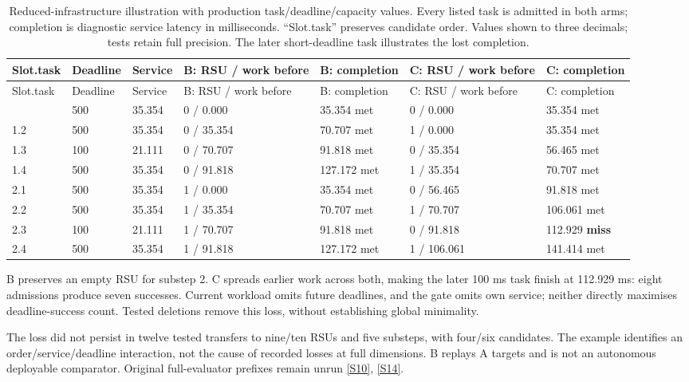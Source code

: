 \documentclass[12pt,a4paper]{article}
\begin{document}
\begingroup
\singlespacing\footnotesize\setlength{\tabcolsep}{3pt}
\begin{xltabular}{\textwidth}{@{}YYYYYYY@{}}
\caption[Adverse dispatch illustration]{Reduced-infrastructure illustration with production task/deadline/capacity values. Every listed task is admitted in both arms; completion is diagnostic service latency in milliseconds. ``Slot.task'' preserves candidate order. Values shown to three decimals; tests retain full precision. The later short-deadline task illustrates the lost completion.}\label{tab:C1} \\
\toprule
Slot.task & Deadline & Service & B: RSU / work before & B: completion & C: RSU / work before & C: completion \\
\midrule\endfirsthead
\toprule
Slot.task & Deadline & Service & B: RSU / work before & B: completion & C: RSU / work before & C: completion \\
\midrule\endhead
\bottomrule{} & 500 & 35.354 & 0 / 0.000 & 35.354 met & 0 / 0.000 & 35.354 met \\
1.2 & 500 & 35.354 & 0 / 35.354 & 70.707 met & 1 / 0.000 & 35.354 met \\
1.3 & 100 & 21.111 & 0 / 70.707 & 91.818 met & 0 / 35.354 & 56.465 met \\
1.4 & 500 & 35.354 & 0 / 91.818 & 127.172 met & 1 / 35.354 & 70.707 met \\
2.1 & 500 & 35.354 & 1 / 0.000 & 35.354 met & 0 / 56.465 & 91.818 met \\
2.2 & 500 & 35.354 & 1 / 35.354 & 70.707 met & 1 / 70.707 & 106.061 met \\
2.3 & 100 & 21.111 & 1 / 70.707 & 91.818 met & 0 / 91.818 & 112.929 \textbf{miss} \\
2.4 & 500 & 35.354 & 1 / 91.818 & 127.172 met & 1 / 106.061 & 141.414 met \\
\end{xltabular}
\endgroup

B preserves an empty RSU for substep 2. C spreads earlier work across both, making the later 100 ms task finish at 112.929 ms: eight admissions produce seven successes. Current workload omits future deadlines, and the gate omits own service; neither directly maximises deadline-success count. Tested deletions remove this loss, without establishing global minimality.

The loss did not persist in twelve tested transfers to nine/ten RSUs and five substeps, with four/six candidates. The example identifies an order/service/deadline interaction, not the cause of recorded losses at full dimensions. B replays A targets and is not an autonomous deployable comparator. Original full-evaluator prefixes remain unrun \hyperref[source-s10]{[S10]}, \hyperref[source-s14]{[S14]}.
\end{document}
